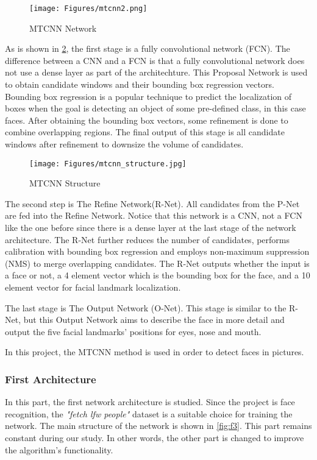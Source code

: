 \begin{figure}[h]
	\centering
	\texttt{[image: Figures/mtcnn2.png]}
	\caption{MTCNN Network}
	\label{fig:mt}
\end{figure}


As is shown in \ref{fig:mt_s}, the first stage is a fully convolutional network (FCN). The difference between a CNN and a FCN is that a fully convolutional network does not use a dense layer as part of the architechture. This Proposal Network is used to obtain candidate windows and their bounding box regression vectors.
Bounding box regression is a popular technique to predict the localization of boxes when the goal is detecting an object of some pre-defined class, in this case faces. After obtaining the bounding box vectors, some refinement is done to combine overlapping regions. The final output of this stage is all candidate windows after refinement to downsize the volume of candidates.

\begin{figure}[!h]
	\centering
	\texttt{[image: Figures/mtcnn\_structure.jpg]}
	\caption{MTCNN Structure}
	\label{fig:mt_s}
\end{figure}

The second step is The Refine Network(R-Net). All candidates from the P-Net are fed into the Refine Network. Notice that this network is a CNN, not a FCN like the one before since there is a dense layer at the last stage of the network architecture. The R-Net further reduces the number of candidates, performs calibration with bounding box regression and employs non-maximum suppression (NMS) to merge overlapping candidates.
The R-Net outputs whether the input is a face or not, a 4 element vector which is the bounding box for the face, and a 10 element vector for facial landmark localization.

The last stage is The Output Network (O-Net). This stage is similar to the R-Net, but this Output Network aims to describe the face in more detail and output the five facial landmarks’ positions for eyes, nose and mouth.

In this project, the MTCNN method is used in order to detect faces in pictures.
\subsubsection*{First Architecture}
In this part, the first network architecture is studied. Since the project is face recognition, the \emph{"fetch lfw people"} dataset is a suitable choice for training the network. The main structure of the network is shown in \ref{fig:f3}. This part remains constant during our study. In other words, the other part is changed to improve the algorithm's functionality. 

